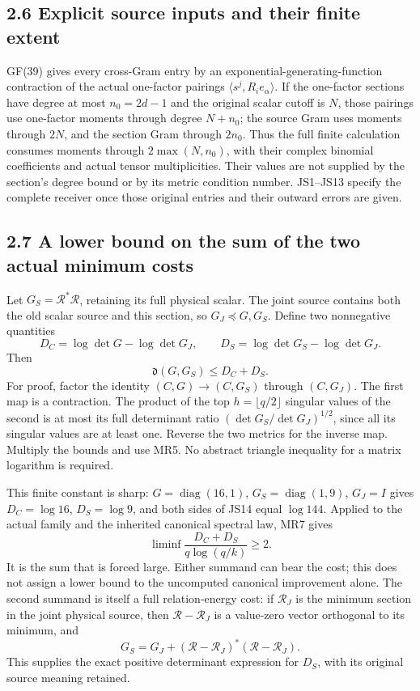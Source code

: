 \documentclass[
  11pt,
]{article}
\begin{document}
\subsection{2.6 Explicit source inputs and their finite
extent}\label{explicit-source-inputs-and-their-finite-extent}

GF(39) gives every cross-Gram entry by an
exponential-generating-function contraction of the actual one-factor
pairings \(\langle s^j,R_ie_\alpha\rangle\). If the one-factor sections
have degree at most \(n_0=2d-1\) and the original scalar cutoff is
\(N\), those pairings use one-factor moments through degree \(N+n_0\);
the source Gram uses moments through \(2N\), and the section Gram
through \(2n_0\). Thus the full finite calculation consumes moments
through \(2\max(N,n_0)\), with their complex binomial coefficients and
actual tensor multiplicities. Their values are not supplied by the
section's degree bound or by its metric condition number. JS1--JS13
specify the complete receiver once those original entries and their
outward errors are given.

\subsection{2.7 A lower bound on the sum of the two actual minimum
costs}\label{a-lower-bound-on-the-sum-of-the-two-actual-minimum-costs}

Let \(G_S=\mathcal R^*\mathcal R\), retaining its full physical scalar.
The joint source contains both the old scalar source and this section,
so \(G_J\preceq G,G_S\). Define two nonnegative quantities \[
D_C=\log\det G-\log\det G_J,
\qquad D_S=\log\det G_S-\log\det G_J.
\] Then \[
\boxed{\mathfrak d(G,G_S)\le D_C+D_S.} \tag{JS14}
\] For proof, factor the identity \((C,G)\to(C,G_S)\) through
\((C,G_J)\). The first map is a contraction. The product of the top
\(h=\lfloor q/2\rfloor\) singular values of the second is at most its
full determinant ratio \((\det G_S/\det G_J)^{1/2}\), since all its
singular values are at least one. Reverse the two metrics for the
inverse map. Multiply the bounds and use MR5. No abstract triangle
inequality for a matrix logarithm is required.

This finite constant is sharp: \(G=\operatorname{diag}(16,1)\),
\(G_S=\operatorname{diag}(1,9)\), \(G_J=I\) gives \(D_C=\log16\),
\(D_S=\log9\), and both sides of JS14 equal \(\log144\). Applied to the
actual family and the inherited canonical spectral law, MR7 gives \[
\boxed{\liminf\frac{D_C+D_S}{q\log(q/k)}\ge2.} \tag{JS15}
\] It is the sum that is forced large. Either summand can bear the cost;
this does not assign a lower bound to the uncomputed canonical
improvement alone. The second summand is itself a full relation-energy
cost: if \(\mathcal R_J\) is the minimum section in the joint physical
source, then \(\mathcal R-\mathcal R_J\) is a value-zero vector
orthogonal to its minimum, and \[
G_S=G_J+(\mathcal R-\mathcal R_J)^*(\mathcal R-\mathcal R_J).
\] This supplies the exact positive determinant expression for \(D_S\),
with its original source meaning retained.
\end{document}

